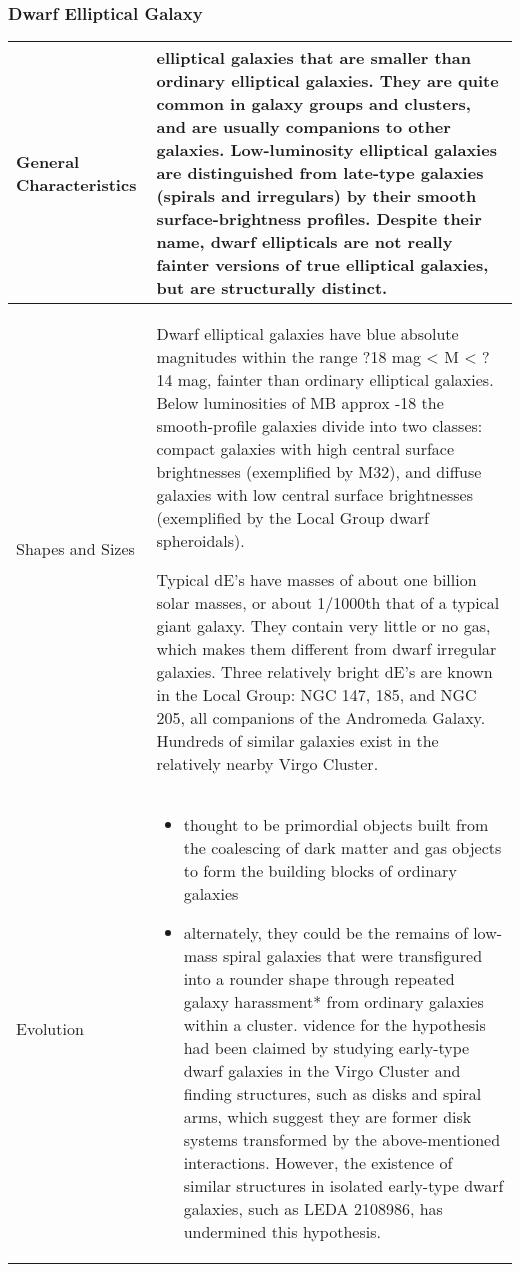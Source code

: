 \subsubsection{Dwarf Elliptical Galaxy}
\begin{longtabu} to 
\hline
General Characteristics &
 elliptical galaxies that are smaller than ordinary elliptical galaxies. They are quite common in galaxy groups and clusters, and are usually companions to other galaxies. Low-luminosity elliptical galaxies are distinguished from late-type galaxies (spirals and irregulars) by their smooth surface-brightness profiles.
Despite their name, dwarf ellipticals are not really fainter versions of true elliptical galaxies, but are structurally distinct.
 \\
 \hline
 Shapes and Sizes &
 Dwarf elliptical galaxies have blue absolute magnitudes within the range ?18 mag < M < ?14 mag, fainter than ordinary elliptical galaxies. Below luminosities of MB approx -18 the smooth-profile galaxies divide into two classes: compact galaxies with high central surface brightnesses (exemplified by M32), and diffuse galaxies with low central surface brightnesses (exemplified by the Local Group dwarf spheroidals).
 
 Typical dE's have masses of about one billion solar masses, or about 1/1000th that of a typical giant galaxy. They contain very little or no gas, which makes them different from dwarf irregular galaxies. Three relatively bright dE's are known in the Local Group: NGC 147, 185, and NGC 205, all companions of the Andromeda Galaxy. Hundreds of similar galaxies exist in the relatively nearby Virgo Cluster.
 \\
 \hline
 Evolution &
 \begin{itemize}[noitemsep]
 	\item thought to be primordial objects built from the coalescing of dark matter and gas objects to form the building blocks of ordinary galaxies
	\item alternately, they could be the remains of low-mass spiral galaxies that were transfigured into a rounder shape through repeated \gls{galaxy harassment}* from ordinary galaxies within a cluster. vidence for the hypothesis had been claimed by studying early-type dwarf galaxies in the Virgo Cluster and finding structures, such as disks and spiral arms, which suggest they are former disk systems transformed by the above-mentioned interactions. However, the existence of similar structures in isolated early-type dwarf galaxies, such as LEDA 2108986, has undermined this hypothesis.
\end{itemize}
\\
\hline
\end{longtabu}